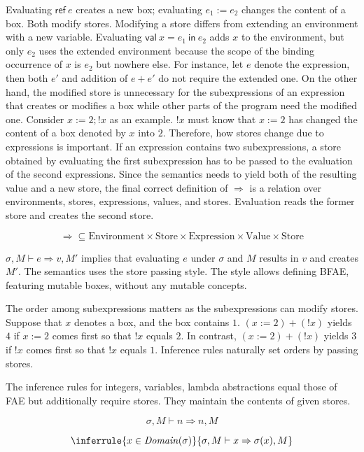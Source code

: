 Evaluating \(\textsf{ref}\ e\) creates a new box; evaluating \(e_1:=e_2\) changes
the content of a box. Both modify stores. Modifying a store differs from
extending an environment with a new variable. Evaluating \(\textsf{val}\ x=e_1\
\textsf{in}\ e_2\) adds \(x\) to the environment, but only \(e_2\) uses the
extended environment because the scope of the binding occurrence of \(x\) is
\(e_2\) but nowhere else. For instance, let \(e\) denote the expression, then
both \(e'\) and addition of \(e+e'\) do not require the extended one. On the
other hand, the modified store is unnecessary for the subexpressions of an
expression that creates or modifies a box while other parts of the program need
the modified one. Consider \(x:=2;!x\) as an example. \(!x\) must know that
\(x:=2\) has changed the content of a box denoted by \(x\) into \(2\). Therefore,
how stores change due to expressions is important. If an expression contains two
subexpressions, a store obtained by evaluating the first subexpression has to be
passed to the evaluation of the second expressions. Since the semantics needs to
yield both of the resulting value and a new store, the final correct definition
of \(\Rightarrow\) is a relation over environments, stores, expressions, values,
and stores. Evaluation reads the former store and creates the second store.


\[\Rightarrow\subseteq\text{Environment}\times\text{Store}\times\text{Expression}\times\text{Value}\times\text{Store}\]

\(\sigma,M\vdash e\Rightarrow v,M'\) implies that evaluating \(e\) under
\(\sigma\) and \(M\) results in \(v\) and creates \(M'\). The semantics uses the
store passing style. The style allows defining BFAE, featuring mutable
boxes, without any mutable concepts.

The order among subexpressions matters as the subexpressions can modify stores.
Suppose that \(x\) denotes a box, and the box contains \(1\). \( (x:=2)+(!x) \)
yields \(4\) if \(x:=2\) comes first so that \(!x\) equals \(2\). In contrast, \(
(x:=2)+(!x) \) yields \(3\) if \(!x\) comes first so that \(!x\) equals \(1\).
Inference rules naturally set orders by passing stores.

The inference rules for integers, variables, lambda abstractions equal those of
FAE but additionally require stores. They maintain the contents of given stores.

\[
\sigma,M\vdash n\Rightarrow n,M
\]

\[
\inferrule
{ x\in\mathit{Domain}(\sigma) }
{ \sigma,M\vdash x\Rightarrow \sigma(x),M }
\]

